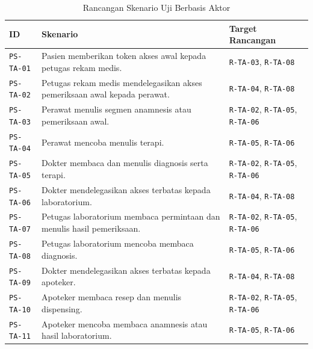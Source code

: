 \begin{table}[!ht]
	\centering
	\caption{Rancangan Skenario Uji Berbasis Aktor}
	\label{tab:rancangan-skenario-uji-aktor}
	\small
	\begin{tabular}{|p{}|p{}|p{}|}
		\hline
		\textbf{ID}       & \textbf{Skenario}                                                         & \textbf{Target Rancangan}                            \\ \hline
		\texttt{PS-TA-01} & Pasien memberikan token akses awal kepada petugas rekam medis.            & \texttt{R-TA-03}, \texttt{R-TA-08}                   \\ \hline
		\texttt{PS-TA-02} & Petugas rekam medis mendelegasikan akses pemeriksaan awal kepada perawat. & \texttt{R-TA-04}, \texttt{R-TA-08}                   \\ \hline
		\texttt{PS-TA-03} & Perawat menulis segmen anamnesis atau pemeriksaan awal.                   & \texttt{R-TA-02}, \texttt{R-TA-05}, \texttt{R-TA-06} \\ \hline
		\texttt{PS-TA-04} & Perawat mencoba menulis terapi.                                           & \texttt{R-TA-05}, \texttt{R-TA-06}                   \\ \hline
		\texttt{PS-TA-05} & Dokter membaca dan menulis diagnosis serta terapi.                        & \texttt{R-TA-02}, \texttt{R-TA-05}, \texttt{R-TA-06} \\ \hline
		\texttt{PS-TA-06} & Dokter mendelegasikan akses terbatas kepada laboratorium.                 & \texttt{R-TA-04}, \texttt{R-TA-08}                   \\ \hline
		\texttt{PS-TA-07} & Petugas laboratorium membaca permintaan dan menulis hasil pemeriksaan.    & \texttt{R-TA-02}, \texttt{R-TA-05}, \texttt{R-TA-06} \\ \hline
		\texttt{PS-TA-08} & Petugas laboratorium mencoba membaca diagnosis.                           & \texttt{R-TA-05}, \texttt{R-TA-06}                   \\ \hline
		\texttt{PS-TA-09} & Dokter mendelegasikan akses terbatas kepada apoteker.                     & \texttt{R-TA-04}, \texttt{R-TA-08}                   \\ \hline
		\texttt{PS-TA-10} & Apoteker membaca resep dan menulis dispensing.                            & \texttt{R-TA-02}, \texttt{R-TA-05}, \texttt{R-TA-06} \\ \hline
		\texttt{PS-TA-11} & Apoteker mencoba membaca anamnesis atau hasil laboratorium.               & \texttt{R-TA-05}, \texttt{R-TA-06}                   \\ \hline

\end{tabular}
\end{table}
